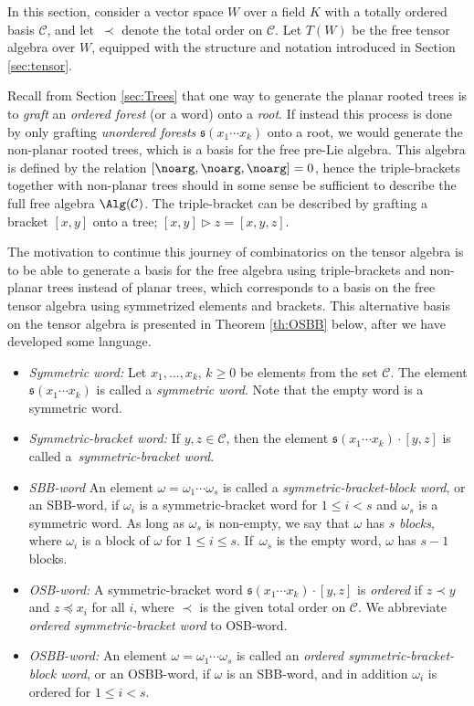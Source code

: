 \documentclass[pdftex]{sigma}
\numberwithin{equation}{section}
\begin{document}
In this section, consider a vector space $W$ over a field $K$ with a totally ordered basis $\mathcal{C}$, and let~$\prec$ denote the total order on $\mathcal{C}$. Let $T(W)$ be the free tensor algebra over $W$, equipped with the structure and notation introduced in Section \ref{sec:tensor}.

Recall from Section \ref{sec:Trees} that one way to generate the planar rooted trees is to \emph{graft} an \emph{ordered forest} (or a word) onto a \emph{root}. If instead this process is done by only grafting \emph{unordered forests} $\mathfrak{s}(x_1 \cdots x_k)$ onto a root, we would generate the non-planar rooted trees, which is a basis for the free pre-Lie algebra. This algebra is defined by the relation $[\noarg, \noarg, \noarg]=0$, hence the triple-brackets together with non-planar trees should in some sense be sufficient to describe the full free algebra $\Alg(\mathcal{C})$. The triple-bracket can be described by grafting a bracket $[x,y]$ onto a tree; $[x,y]\rhd z = [x,y,z]$.

The motivation to continue this journey of combinatorics on the tensor algebra is to be able to generate a basis for the free algebra using triple-brackets and non-planar trees instead of planar trees, which corresponds to a basis on the free tensor algebra using symmetrized elements and brackets. This alternative basis on the tensor algebra is presented in Theorem \ref{th:OSBB} below, after we have developed some language.
\begin{itemize}\itemsep=0pt
 \item \textit{Symmetric word:} Let $x_1, \dots, x_k$, $k\geq 0$ be elements from the set $\mathcal{C}$. The element $\mathfrak{s}(x_1 \cdots x_k)$ is called a \emph{symmetric word}. Note that the empty word is a symmetric word.
 \item \textit{Symmetric-bracket word:} If $y,z \in \mathcal{C}$, then the element $\mathfrak{s}(x_1 \cdots x_k) \cdot [y,z]$ is called a~\emph{sym\-met\-ric-bracket word}.
 \item \textit{SBB-word} An element $\omega = \omega_1 \cdots \omega_s$ is called a \emph{symmetric-bracket-block word}, or an SBB-word, if $\omega_i$ is a symmetric-bracket word for $1\leq i <s$ and $\omega_s$ is a symmetric word. As long as $\omega_s$ is non-empty, we say that $\omega$ has $s$ \emph{blocks}, where $\omega_i$ is a block of $\omega$ for $1\leq i \leq s$. If~$\omega_s$ is the empty word, $\omega$ has $s-1$ blocks.
 \item \textit{OSB-word:} A symmetric-bracket word $\mathfrak{s}(x_1 \cdots x_k) \cdot [y,z]$ is \emph{ordered} if $z\prec y$ and $z \preceq x_i$ for all $i$, where $\prec$ is the given total order on $\mathcal{C}$. We abbreviate \emph{ordered symmetric-bracket word} to OSB-word.
 \item \textit{OSBB-word:} An element $\omega = \omega_1 \cdots \omega_s$ is called an \emph{ordered symmetric-bracket-block word}, or an OSBB-word, if $\omega$ is an SBB-word, and in addition $\omega_i$ is ordered for $1\leq i <s$.
\end{itemize}
\end{document}
